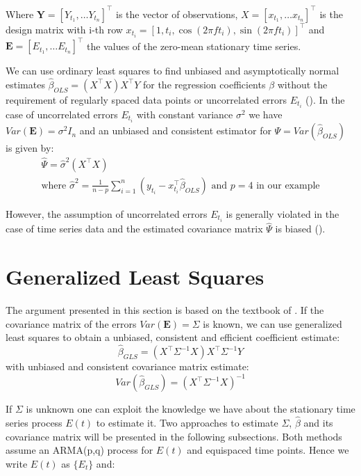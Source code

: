 Where $\mathbf{Y} = [Y_{t_1}, \dots Y_{t_n}]^{\top}$ is the vector of observations,
$X = [x_{t_1}, \dots x_{t_n}]^{\top}$ is the design matrix with i-th row
$x_{t_i} = [1, t_i, \cos(2 \pi f t_i), \sin(2 \pi f t_i)]^{\top}$
and $\mathbf{E} = [E_{t_1}, \dots E_{t_n}]^{\top}$ the values of the zero-mean stationary time series.

We can use ordinary least squares to find unbiased and asymptotically normal estimates $\hat{\beta}_{OLS} = (X^{\top}X) X^{\top}Y$
for the regression coefficients $\beta$ without the requirement of regularly spaced data points or uncorrelated errors
$E_{t_i}$ (\citeauthor{white_asymptotic_2001}).
In the case of uncorrelated errors $E_{t_i}$ with constant variance $\sigma^2$ we have
$Var(\mathbf{E}) = \sigma^2 I_n$ and an unbiased and consistent estimator for $\Psi = Var(\hat{\beta}_{OLS})$ is given by:
\begin{gather*}
\hat{\Psi} = \hat{\sigma}^2(X^{\top}X) \\
    \text{where $\hat{\sigma}^2=\frac{1}{n-p} \sum_{i = 1}^{n} (y_{t_i} - x_{t_i}^{\top} \hat{\beta}_{OLS})$ and $p=4$ in our example}
\end{gather*}

However, the assumption of uncorrelated errors $E_{t_i}$ is generally violated in the case of time series data and the
estimated covariance matrix $\hat{\Psi}$ is biased (\citeauthor{brockwell_introduction_2016}).



\section{Generalized Least Squares}

The argument presented in this section is based on the textbook of \citeauthor{brockwell_introduction_2016}.
If the covariance matrix of the errors $Var(\mathbf{E}) = \Sigma$ is known,
we can use generalized least squares to obtain a unbiased, consistent and efficient coefficient estimate:
\[\hat{\beta}_{GLS} = (X^{\top} \Sigma^{-1} X) X^{\top} \Sigma^{-1} Y\]
with unbiased and consistent covariance matrix estimate:
\[Var(\hat{\beta}_{GLS}) = (X^{\top} \Sigma^{-1} X)^{-1}\]

If $\Sigma$ is unknown one can exploit the knowledge we have about the stationary time series process $E(t)$ to estimate it.
Two approaches to estimate $\Sigma$, $\hat \beta $ and its covariance matrix will be presented in the following subsections.
Both methods assume an ARMA(p,q) process for $E(t)$ and equispaced time points. Hence we write $E(t)$ as $\{E_t\}$ and:

